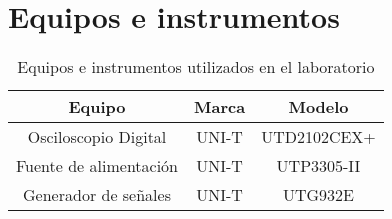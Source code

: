 
\section{Equipos e instrumentos}

\begin{table}[H]
    \centering
    \begin{tabular}{|c|c|c|}
        \hline
        \textbf{Equipo} & \textbf{Marca} & \textbf{Modelo} \\\hline
        Osciloscopio Digital & UNI-T & UTD2102CEX+ \\\hline
        Fuente de alimentación & UNI-T & UTP3305-II \\\hline
        Generador de señales & UNI-T & UTG932E \\\hline
    \end{tabular}    
    \caption{Equipos e instrumentos utilizados en el laboratorio}
    \label{tab:equipos}
\end{table}
